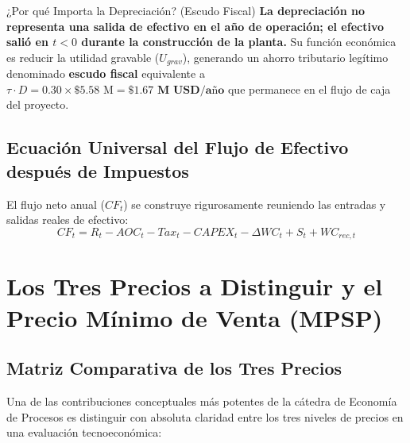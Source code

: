 \documentclass[11pt,letterpaper]{article}
\begin{document}
\begin{conceptbox}{¿Por qué Importa la Depreciación? (Escudo Fiscal)}
\textbf{La depreciación no representa una salida de efectivo en el año de operación; el efectivo salió en $t < 0$ durante la construcción de la planta.} Su función económica es reducir la utilidad gravable ($U_{grav}$), generando un ahorro tributario legítimo denominado \textbf{escudo fiscal} equivalente a $\tau \cdot D = 0.30 \times \$5.58\text{ M} = \mathbf{\$1.67\text{ M USD/año}}$ que permanece en el flujo de caja del proyecto.
\end{conceptbox}

\subsection{Ecuación Universal del Flujo de Efectivo después de Impuestos}
El flujo neto anual ($CF_t$) se construye rigurosamente reuniendo las entradas y salidas reales de efectivo:
\begin{equation}
    \boxed{CF_t = R_t - AOC_t - Tax_t - CAPEX_t - \Delta WC_t + S_t + WC_{rec,t}}
\end{equation}

\newpage

\section{Los Tres Precios a Distinguir y el Precio Mínimo de Venta (MPSP)}

\subsection{Matriz Comparativa de los Tres Precios}
Una de las contribuciones conceptuales más potentes de la cátedra de Economía de Procesos es distinguir con absoluta claridad entre los tres niveles de precios en una evaluación tecnoeconómica:
\end{document}
